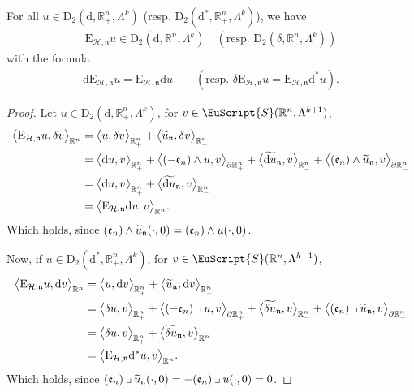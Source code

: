 \documentclass[AHL,Unicode,longabstracts,published]{cedram}
\newcommand{\bbR}{\mathbb{R}}
\newcommand{\rmd}{\mathrm{d}}
\newcommand{\rmD}{\mathrm{D}}
\newcommand{\rmE}{\mathrm{E}}
\newcommand{\clH}{\mathcal{H}}
\newcommand{\fkn}{\mathfrak{n}}
\newcommand{\fke}{\mathfrak{e}}
\newcommand{\eus}{\EuScript}
\newcommand{\iprod}{\mathbin{\lrcorner}}
\let\oldtilde\tilde
\renewcommand*{\tilde}[1]{\mathchoice{\widetilde{#1}}{\widetilde{#1}}{\oldtilde{#1}}{\oldtilde{#1}}}
\begin{document}
\begin{lemm}\label{lem:ExtOpRn+DiffFormL2}
For all $u\in\rmD_{2}(\rmd,\bbR^n_+,\Lambda^{k})$ (resp. $\rmD_{2}({\rmd}^\ast,\bbR^n_+,\Lambda^{k})$), we have
\begin{align*}
\rmE _{\clH,\fkn} u \in \rmD_{2}\left(\rmd,\bbR^n,\Lambda^{k}\right) \quad\left(\text{resp. } \rmD_{2}\left(\delta,\bbR^n,\Lambda^{k}\right)\right)
\end{align*}
with the formula
\begin{align*}
\rmd \rmE_{\clH,\fkn} u = \rmE_{\clH,\fkn} \rmd u \qquad \left(\text{resp. } \delta \rmE_{\clH,\fkn} u = \rmE_{\clH,\fkn} \rmd^\ast u\right).
\end{align*}
\end{lemm}


\begin{proof}
Let $u\in\rmD_{2}(\rmd,\bbR^n_+,\Lambda^{k})$, for $v\in\eus{S}(\bbR^n,\Lambda^{k+1})$,
\begin{align*}
\big\langle \rmE _{\clH,\fkn} u, \delta v\big\rangle_{\bbR^n} &= \big\langle u, \delta v\big\rangle_{\bbR^n_+} + \big\langle \tilde{u}_{\fkn}, \delta v\big\rangle_{\bbR^n_{-}} \\
&= \big\langle \rmd u, v\big\rangle_{\bbR^n_+} + \big\langle (-\fke _n)\wedge u, v\big\rangle_{\partial\bbR^n_+} + \big\langle \widetilde{\rmd u}_{\fkn}, v\big\rangle_{\bbR^n_{-}} + \big\langle (\fke_n)\wedge \tilde{u}_{\fkn}, v\big\rangle_{\partial\bbR^n_-}\\
&= \big\langle \rmd u, v\big\rangle_{\bbR^n_+} + \big\langle \widetilde{\rmd u}_{\fkn}, v\big\rangle_{\bbR^n_{-}} \\
&= \big\langle \rmE_{\clH,\fkn} \rmd u, v\big\rangle_{\bbR^n} .
\end{align*}
Which holds, since $(\fke_n)\wedge \tilde{u}_{\fkn}(\cdot,0)=(\fke_n)\wedge {u}(\cdot,0)$.

Now, if $u\in\rmD_{2}(\rmd^\ast,\bbR^n_+,\Lambda^{k})$, for $v\in\eus{S}(\bbR^n,\Lambda^{k-1})$,
\begin{align*}
\big\langle \rmE_{\clH,\fkn} u, \rmd v\big\rangle_{\bbR^n} &= \big\langle u, \rmd v\big\rangle_{\bbR^n_+} + \big\langle \tilde{u}_{\fkn}, \rmd v\big\rangle_{\bbR^n_{-}} \\
&= \big\langle \delta u, v\big\rangle_{\bbR^n_+} + \big\langle (-\fke_n)\iprod u, v\big\rangle_{\partial\bbR^n_+} + \big\langle \widetilde{\delta u}_{\fkn}, v\big\rangle_{\bbR^n_{-}} + \big\langle (\fke_n)\iprod \tilde{u}_{\fkn}, v\big\rangle_{\partial\bbR^n_-}\\
&= \big\langle \delta u, v\big\rangle_{\bbR^n_+} + \big\langle \widetilde{\delta u}_{\fkn}, v\big\rangle_{\bbR^n_{-}} \\
&= \big\langle \rmE _{\clH,\fkn} \rmd^\ast u, v\big\rangle_{\bbR^n} .
\end{align*}
Which holds, since $(\fke_n)\iprod \tilde{u}_{\fkn}(\cdot,0)=-(\fke_n)\iprod {u}(\cdot,0)=0$.
\end{proof}
\end{document}

